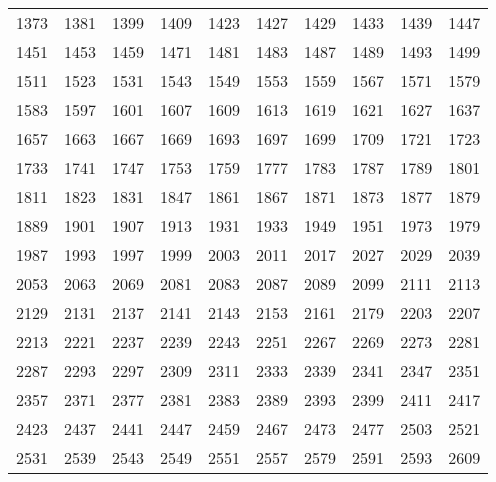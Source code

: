 \begin{center}
\begin{tabular}{llllllllll}
1373 &1381 &1399 &1409 &1423 &1427 &1429 &1433 &1439 &1447 \\
1451 &1453 &1459 &1471 &1481 &1483 &1487 &1489 &1493 &1499 \\
1511 &1523 &1531 &1543 &1549 &1553 &1559 &1567 &1571 &1579 \\
1583 &1597 &1601 &1607 &1609 &1613 &1619 &1621 &1627 &1637 \\
1657 &1663 &1667 &1669 &1693 &1697 &1699 &1709 &1721 &1723 \\
1733 &1741 &1747 &1753 &1759 &1777 &1783 &1787 &1789 &1801 \\
1811 &1823 &1831 &1847 &1861 &1867 &1871 &1873 &1877 &1879 \\
1889 &1901 &1907 &1913 &1931 &1933 &1949 &1951 &1973 &1979 \\
1987 &1993 &1997 &1999 &2003 &2011 &2017 &2027 &2029 &2039 \\
2053 &2063 &2069 &2081 &2083 &2087 &2089 &2099 &2111 &2113 \\
2129 &2131 &2137 &2141 &2143 &2153 &2161 &2179 &2203 &2207 \\
2213 &2221 &2237 &2239 &2243 &2251 &2267 &2269 &2273 &2281 \\
2287 &2293 &2297 &2309 &2311 &2333 &2339 &2341 &2347 &2351 \\
2357 &2371 &2377 &2381 &2383 &2389 &2393 &2399 &2411 &2417 \\
2423 &2437 &2441 &2447 &2459 &2467 &2473 &2477 &2503 &2521 \\
2531 &2539 &2543 &2549 &2551 &2557 &2579 &2591 &2593 &2609 \\
\end{tabular}
\end{center}
